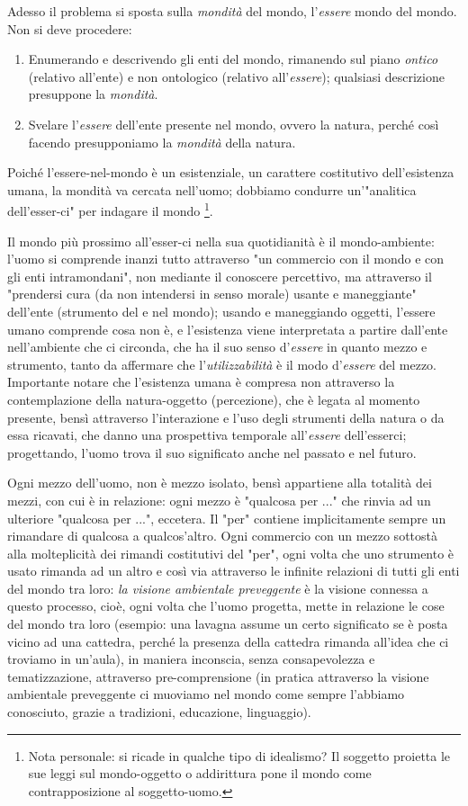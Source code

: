 \documentclass[a4paper,12pt,oneside]{article}%
\begin{document}
Adesso il problema si sposta sulla \textit{mondità} del mondo, l'\textit{essere} mondo del mondo. Non si deve procedere:

\begin{enumerate}
	\item Enumerando e descrivendo gli enti del mondo, rimanendo sul piano \textit{ontico} (relativo all'ente) e non ontologico (relativo all'\textit{essere}); qualsiasi descrizione presuppone la \textit{mondità}.
	\item Svelare l'\textit{essere} dell'ente presente nel mondo, ovvero la natura, perché così facendo presupponiamo la \textit{mondità} della natura.
\end{enumerate}

Poiché l'essere-nel-mondo è un esistenziale, un carattere costitutivo dell'esistenza umana, la mondità va cercata nell'uomo; dobbiamo condurre un'"analitica dell'esser-ci" per indagare il mondo \footnote{Nota personale: si ricade in qualche tipo di idealismo? Il soggetto proietta le sue leggi sul mondo-oggetto o addirittura pone il mondo come contrapposizione al soggetto-uomo.}.
	
Il mondo più prossimo all'esser-ci nella sua quotidianità è il mondo-ambiente: l'uomo si comprende inanzi tutto attraverso "un commercio con il mondo e con gli enti intramondani", non mediante il conoscere percettivo, ma attraverso il "prendersi cura (da non intendersi in senso morale) usante e maneggiante" dell'ente (strumento del e nel mondo); usando e maneggiando oggetti, l'essere umano comprende cosa non è, e l'esistenza viene interpretata a partire dall'ente nell'ambiente che ci circonda, che ha il suo senso d'\textit{essere} in quanto mezzo e strumento, tanto da affermare che l'\textit{utilizzabilità} è il modo d'\textit{essere} del mezzo. Importante notare che l'esistenza umana è compresa non attraverso la contemplazione della natura-oggetto (percezione), che è legata al momento presente, bensì attraverso l'interazione e l'uso degli strumenti della natura o da essa ricavati, che danno una prospettiva temporale all'\textit{essere} dell'esserci; progettando, l'uomo trova il suo significato anche nel passato e nel futuro.


Ogni mezzo dell'uomo, non è mezzo isolato, bensì appartiene alla totalità dei mezzi, con cui è in relazione: ogni mezzo è "qualcosa per ..." che rinvia ad un ulteriore "qualcosa per ...", eccetera. Il "per" contiene implicitamente sempre un rimandare di qualcosa a qualcos'altro. Ogni commercio con un mezzo sottostà alla molteplicità dei rimandi costitutivi del "per", ogni volta che uno strumento è usato rimanda ad un altro e così via attraverso le infinite relazioni di tutti gli enti del mondo tra loro: \textit{la visione ambientale preveggente} è la visione connessa a questo processo, cioè, ogni volta che l'uomo progetta, mette in relazione le cose del mondo tra loro (esempio: una lavagna assume un certo significato se è posta vicino ad una cattedra, perché la presenza della cattedra rimanda all’idea che ci troviamo in un’aula), in maniera inconscia, senza consapevolezza e tematizzazione, attraverso pre-comprensione (in pratica attraverso la visione ambientale preveggente ci muoviamo nel mondo come sempre l'abbiamo conosciuto, grazie a tradizioni, educazione, linguaggio).
\end{document}
